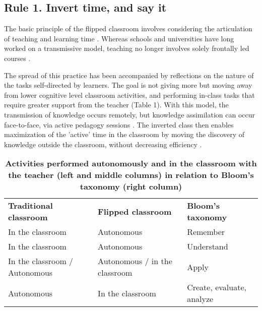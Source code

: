 \documentclass[10pt,letterpaper]{article}
\newlength\savedwidth
\newcommand\thickhline{\noalign{\global\savedwidth\arrayrulewidth\global\arrayrulewidth 2pt}%
\hline
\noalign{\global\arrayrulewidth\savedwidth}}
\begin{document}
\subsection{Rule 1. Invert time, and say it }

The basic principle of the flipped classroom involves considering the articulation of teaching and learning time \cite{bergmann_flip_2012,schell_flipping_2015}. Whereas schools and universities have long worked on a transmissive model, 
teaching no longer involves solely frontally led courses \cite{crouch_peer_2001}.

The spread of this practice has been accompanied by reflections on the nature of the tasks self-directed by learners. 
The goal is not giving more \cite{lo_critical_2017} but moving away from lower cognitive level classroom activities, 
and performing in-class tasks that require greater support from the teacher \cite{lebrun_vers_2016,anderson_taxonomy_2001,bloom_taxonomy_1956,sarawagi_flipped_2014} (Table 1). 
With this model, the transmission of knowledge occurs remotely, but knowledge assimilation can occur face-to-face, 
via active pedagogy sessions \cite{freeman_reply_2014}. 
The inverted class then enables maximization of the 'active' time in the classroom 
by moving the discovery of knowledge outside the classroom, without decreasing efficiency \cite{delozier_flipped_2017}.


\begin{table}[!ht]
\begin{adjustwidth}{-2.25in}{0in} %
\centering
\caption{{\bf Activities performed autonomously and in the classroom with the teacher (left and middle columns) in relation to Bloom's taxonomy (right column)}}
\begin{tabular}{|l|l|l|}
\hline
{\bf Traditional classroom} & {\bf Flipped classroom} & {\bf Bloom's taxonomy} \\ \thickhline
In the classroom & Autonomous & Remember \\ \hline
In the classroom & Autonomous & Understand \\ \hline
In the classroom / Autonomous & Autonomous / in the classroom & Apply \\ \hline
Autonomous & In the classroom & Create, evaluate, analyze \\ \hline



\end{tabular}
\label{table1}
\end{adjustwidth}
\end{table}
\end{document}
